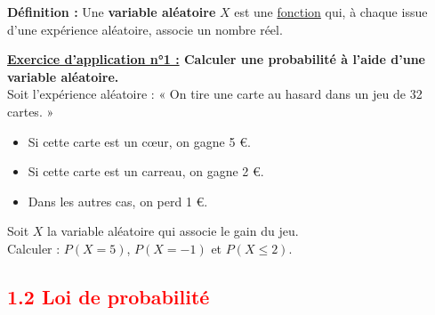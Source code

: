 \documentclass[12pt]{article}
\begin{document}
\begin{mdframed}[
    linewidth=1pt,
    roundcorner=5pt,
    linecolor=ForestGreen
]
{\color{ForestGreen}\textbf{Définition :}}
Une \textbf{variable aléatoire} $X$ est une \underline{fonction} qui, à chaque issue d'une expérience 
aléatoire, associe un nombre réel.
\end{mdframed}


\begin{mdframed}[
    linewidth=1pt,
    roundcorner=5pt,
    linecolor=RoyalBlue,
    innertopmargin=10pt,
    innerbottommargin=10pt
]
{\color{RoyalBlue}\textbf{\underline{Exercice d'application n°1 :} Calculer une probabilité à l’aide 
d’une variable aléatoire.}}
\vspace{5pt}
\\
Soit l'expérience aléatoire : « On tire une carte au hasard dans un jeu de 32 cartes. »  
\begin{itemize}
    \item Si cette carte est un cœur, on gagne 5 €.
    \item Si cette carte est un carreau, on gagne 2 €.
    \item Dans les autres cas, on perd 1 €.
\end{itemize}

Soit $X$ la variable aléatoire qui associe le gain du jeu.  
\vspace{5pt}
\\
Calculer : $P(X = 5)$, $P(X = -1)$ et $P(X \le 2)$.

\end{mdframed}

\vspace{20pt}

\subsection*{\textcolor{red}{1.2 Loi de probabilité}}

\vspace{5pt}
\end{document}
